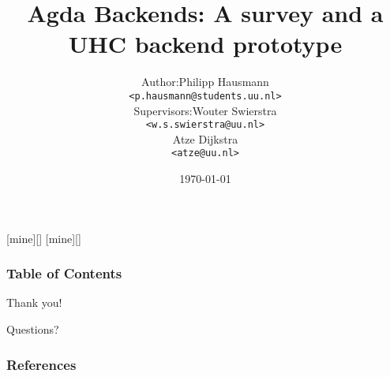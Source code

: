 \documentclass[english]{beamer}
\title[Agda UHC Backend]{Agda Backends: A survey and a UHC backend prototype}
\date{\today}
\institute[Utrecht University] {
    Department of Information and Computing Sciences \\
    Utrecht University
}
\begin{document}
    \author[P. Hausmann]{
        \begin{tabular}{r@{ }l}
            Author:     & Philipp Hausmann \\
                        & \small{\texttt{<p.hausmann@students.uu.nl>}} \\[2ex]
            Supervisors: & Wouter Swierstra \\
                        & \small{\texttt{<w.s.swierstra@uu.nl>}} \\
                        & Atze Dijkstra \\
                        & \small{\texttt{<atze@uu.nl>}}
        \end{tabular}
    }

    [mine][]
    [mine][]

    \begin{frame}
        \titlepage
    \end{frame}

    \begin{frame}
        \frametitle{Table of Contents}
        \tableofcontents
    \end{frame}


    
    
    
%    
%    
%    
%    
%    


    \begin{frame}[plain]
        \begin{center}
            \par{\Huge{Thank you!}}
            \vspace{\baselineskip}
            \par{\Huge{Questions?}}


        \end{center}
    \end{frame}

    \nocite{*}
    \begin{frame}[t,allowframebreaks]
        \frametitle{References}
%        
        \printbibliography
    \end{frame}
\end{document}
